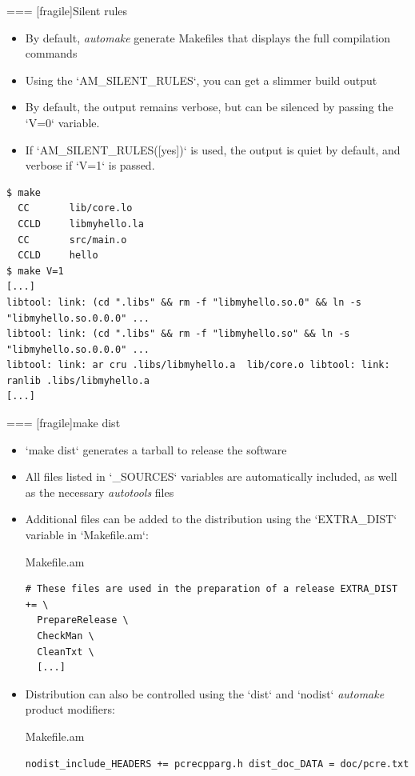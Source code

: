 === [fragile]{Silent rules}

  \begin{itemize}
  \item By default, {\em automake} generate Makefiles that displays
    the full compilation commands
  \item Using the `AM_SILENT_RULES`, you can get a slimmer build
    output
  \item By default, the output remains verbose, but can be silenced by
    passing the `V=0` variable.
  \item If `AM_SILENT_RULES([yes])` is used, the output is quiet
    by default, and verbose if `V=1` is passed.
  \end{itemize}

  \begin{block}{}
\begin{verbatim}
$ make
  CC       lib/core.lo
  CCLD     libmyhello.la
  CC       src/main.o
  CCLD     hello
$ make V=1
[...]
libtool: link: (cd ".libs" && rm -f "libmyhello.so.0" && ln -s "libmyhello.so.0.0.0" ...
libtool: link: (cd ".libs" && rm -f "libmyhello.so" && ln -s "libmyhello.so.0.0.0" ...
libtool: link: ar cru .libs/libmyhello.a  lib/core.o libtool: link: ranlib .libs/libmyhello.a
[...]
\end{verbatim}
  \end{block}



=== [fragile]{make dist}

  \begin{itemize}
  \item `make dist` generates a tarball to release the software
  \item All files listed in `_SOURCES` variables are
    automatically included, as well as the necessary {\em autotools}
    files
  \item Additional files can be added to the distribution using the
    `EXTRA_DIST` variable in `Makefile.am`:
\begin{block}{Makefile.am}
\begin{verbatim}
# These files are used in the preparation of a release EXTRA_DIST += \
  PrepareRelease \
  CheckMan \
  CleanTxt \
  [...]
\end{verbatim}
\end{block}
\item Distribution can also be controlled using the `dist` and
  `nodist` {\em automake} product modifiers:
\begin{block}{Makefile.am}
\begin{verbatim}
nodist_include_HEADERS += pcrecpparg.h dist_doc_DATA = doc/pcre.txt
\end{verbatim}
\end{block}

\end{itemize}



